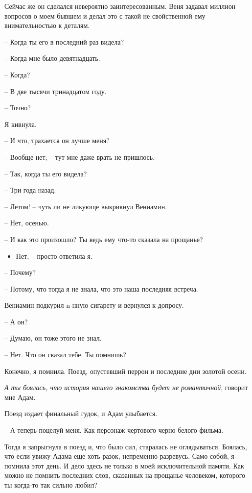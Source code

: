 \documentclass[
]{book}
\providecommand{\tightlist}{%
  \setlength{\itemsep}{0pt}\setlength{\parskip}{0pt}}
\begin{document}
Сейчас же он сделался невероятно заинтересованным. Веня задавал миллион вопросов о моем бывшем и делал это с такой не свойственной ему внимательностью к деталям.

-- Когда ты его в последний раз видела?

-- Когда мне было девятнадцать.

-- Когда?

-- В две тысячи тринадцатом году.

-- Точно?

Я кивнула.

-- И что, трахается он лучше меня?

-- Вообще нет, -- тут мне даже врать не пришлось.

-- Так, когда ты его видела?

-- Три года назад.

-- Летом! -- чуть ли не ликующе выкрикнул Вениамин.

-- Нет, осенью.

-- И как это произошло? Ты ведь ему что-то сказала на прощанье?

\begin{itemize}
\tightlist
\item
  Нет, -- просто ответила я.
\end{itemize}

-- Почему?

-- Потому, что тогда я не знала, что это наша последняя встреча.

Вениамин подкурил n-нную сигарету и вернулся к допросу.

-- А он?

-- Думаю, он тоже этого не знал.

-- Нет. Что он сказал тебе. Ты помнишь?

Конечно, я помнила. Поезд, опустевший перрон и последние дни золотой осени.

\emph{А ты боялась, что история нашего знакомства будет не романтичной}, говорит мне Адам.

Поезд издает финальный гудок, и Адам улыбается.

-- А теперь поцелуй меня. Как персонаж чертового черно-белого фильма.

Тогда я запрыгнула в поезд и, что было сил, старалась не оглядываться. Боялась, что если увижу Адама еще хоть разок, непременно разревусь. Само собой, я помнила этот день. И дело здесь не только в моей исключительной памяти. Как можно не помнить последних слов, сказанных на прощанье человеком, которого ты когда-то так сильно любил?
\end{document}
